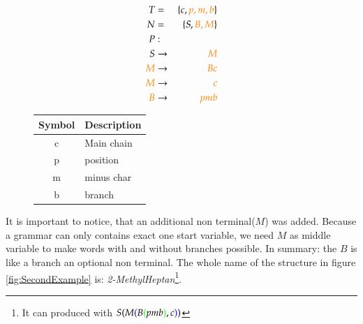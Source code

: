 \documentclass[
fontsize=11pt,
paper=a4,
abstract=true,
numbers=noenddot,
listof=totoc,
bibliography=totoc,
twoside,
open=right,
cleardoublepage=plain,
parskip=half+, %
BCOR=1cm, %
]{scrreprt}
\newcommand{\gerquot}[1]{\glqq#1\grqq}
\newcommand{\dashAndSpace}{\textendash \space}
\newcommand{\dashAndSpaceSeq}[1]{\dashAndSpace#1 \textendash}
\newcommand{\captionVSpace}{\vspace*{-0.05cm}}
\newcommand{\CFGDefinitionSize}{0.60}
\newcommand{\SymbolDescriptionTable}{0.35}
\newcommand{\colorBracketFirstNesting}{black}
\newcommand{\colorBracketSecondNesting}{blue}
\newcommand{\colorBracketThirdNesting}{green}
\newcommand{\colorNew}{orange}
\newcommand{\nonterminal}{non terminal}
\begin{document}
\begin{figure}[H]
    \begin{minipage}[l]{\CFGDefinitionSize\textwidth}
        $$
        \begin{aligned}
            T &=& \{c, {\color{\colorNew}p, m, b}\} \\
            N &=& \{S, {\color{\colorNew}B, M}\} \\
            P &:& \\
            S &\rightarrow& {\color{\colorNew}M} \\
            {\color{\colorNew}M} &\rightarrow& {\color{\colorNew}Bc} \\
            {\color{\colorNew}M} &\rightarrow& {\color{\colorNew}c} \\
            {\color{\colorNew}{B}} &\rightarrow& {\color{\colorNew}pmb} \\
        \end{aligned}
        $$
        \caption{CFG with exact one branch. $B \rightarrow pmb$ is an optional production rule.}
        \label{fig:CFGWithExactOneBranch}
    \end{minipage}
    \begin{minipage}[r]{\SymbolDescriptionTable\textwidth}
        \begin{table}[H]
        \centering
            \begin{tabular}{c|l}
                \toprule
                \textbf{Symbol} & \textbf{Description} \\
                \midrule
                c & Main chain \\
                p & position \\
                m & minus char \\
                b & branch \\
                \bottomrule
            \end{tabular}
        \end{table}
    \end{minipage}
\end{figure}

It is important to notice, that an additional \nonterminal\space ($M$) was added. Because a grammar can only contains exact one start variable, we need $M$ as \gerquot{middle variable} to make words with and without branches possible. In summary: the $B$ is \dashAndSpaceSeq{like a branch} an optional \nonterminal.
The whole name of the structure in figure \ref{fig:SecondExample} is: \emph{2-MethylHeptan}\footnote{It can produced with
$
S
{\color{\colorBracketFirstNesting}{(}}
    M
    {\color{\colorBracketSecondNesting}{(}}
        B
        {\color{\colorBracketThirdNesting}{(}}
            pmb
        {\color{\colorBracketThirdNesting}{)}}
        , c
    {\color{\colorBracketSecondNesting}{)}}
{\color{\colorBracketFirstNesting}{)}}
$}.
\end{document}
